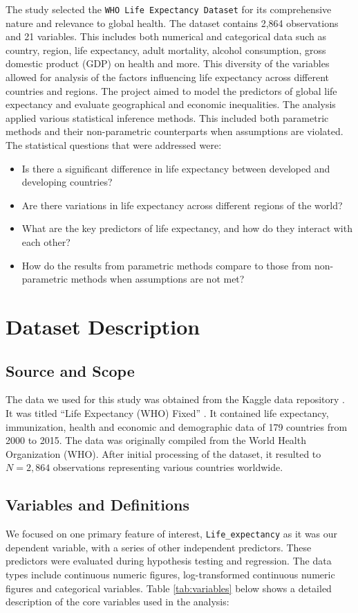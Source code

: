 \documentclass[3pt, a4paper]{article}
\begin{document}
The study selected the \texttt{WHO Life Expectancy Dataset} \citep{lasha_gochiashvili_2023} for its comprehensive nature and relevance to global health. The dataset contains 2,864 observations and 21 variables. This includes both numerical and categorical data such as country, region, life expectancy, adult mortality, alcohol consumption, gross domestic product (GDP) on health and more. This diversity of the variables allowed for analysis of the factors influencing life expectancy across different countries and regions. The project aimed to model the predictors of global life expectancy and evaluate geographical and economic inequalities. The analysis applied various statistical inference methods. This included both parametric methods and their non-parametric counterparts when assumptions are violated. The statistical questions that were addressed were:
\begin{itemize}[noitemsep,topsep=0pt]
    \item Is there a significant difference in life expectancy between developed and developing countries?
    \item Are there variations in life expectancy across different regions of the world?
    \item What are the key predictors of life expectancy, and how do they interact with each other?
    \item How do the results from parametric methods compare to those from non-parametric methods when assumptions are not met?
\end{itemize}


\section{Dataset Description}
\subsection{Source and Scope}
The data we used for this study was obtained from the Kaggle data repository \citep{lasha_gochiashvili_2023}. It was titled ``Life Expectancy (WHO) Fixed'' . It contained life expectancy, immunization, health and economic and demographic data of 179 countries from 2000 to 2015. The data was originally compiled from the World Health Organization (WHO). After initial processing of the dataset, it resulted to $N = 2,864$ observations representing various countries worldwide. 

\subsection{Variables and Definitions}
We focused on one primary feature of interest, \texttt{Life\_expectancy} as it was our dependent variable, with a series of other independent predictors. These predictors were evaluated during hypothesis testing and regression. The data types include continuous numeric figures, log-transformed continuous numeric figures and categorical variables. Table \ref{tab:variables} below shows a detailed description of the core variables used in the analysis:
\end{document}

